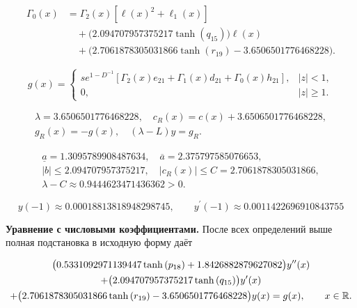 \begin{equation}
\begin{aligned}\Gamma_0(x)&=\Gamma_2(x)[\ell(x)^2+\ell_1(x)]\\&\quad+\bigl(2.094707957375217 \tanh{\left(q_{15} \right)}\bigr)\ell(x)\\&\quad+\bigl(2.7061878305031866 \tanh{\left(r_{19} \right)} - 3.6506501776468228\bigr).\end{aligned}
\end{equation}


\begin{equation}\label{eq:ex6-forcing}
g(x)=\begin{cases}s e^{1-D^{-1}}[\Gamma_2(x)e_{21}+\Gamma_1(x)d_{21}+\Gamma_0(x)h_{21}],&|z|<1,\\0,&|z|\ge1.\end{cases}
\end{equation}


\begin{equation}
\begin{aligned}\lambda=3.6506501776468228,\quad c_R(x)=c(x)+3.6506501776468228,\\g_R(x)=-g(x),\quad (\lambda-L)y=g_R.\end{aligned}
\end{equation}


\begin{equation}
\begin{aligned}\underline a=1.3095789908487634,\quad \overline a=2.375797585076653,\\|b|\le2.094707957375217,\quad |c_R(x)|\le C=2.7061878305031866,\\\lambda-C\approx0.9444623471436362>0.\end{aligned}
\end{equation}


\begin{equation}
y(-1)\approx0.00018813818948298745,\qquad y^\prime(-1)\approx0.0011422696910843755
\end{equation}


\noindent\textbf{Уравнение с числовыми коэффициентами.} После всех определений выше полная подстановка в исходную форму даёт

\begin{multline}\label{eq:ex6-ode}\bigl(0.5331092971139447 \tanh{\left(p_{18} \right)} + 1.8426882879627082\bigr)y^{\prime\prime}(x)\\+\bigl(2.094707957375217 \tanh{\left(q_{15} \right)}\bigr)y^\prime(x)\\+\bigl(2.7061878305031866 \tanh{\left(r_{19} \right)} - 3.6506501776468228\bigr)y(x)=g(x),\qquad x\in\mathbb R.\end{multline}

